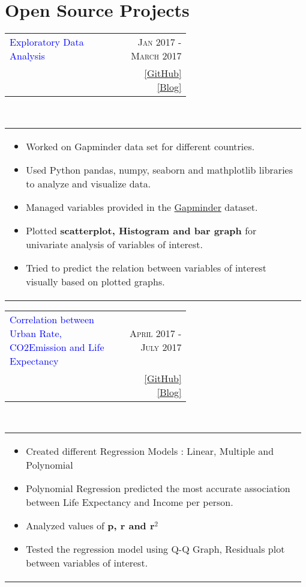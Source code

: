 \documentclass[a4paper]{article} %
\newcommand{\verticalspacing}{-0.25cm}
\newcommand{\bulletspace}{0.7cm}
\newcommand{\projectheadspacing}{6.9cm}
\newcommand{\cproject}[5]{%
    \begin{tabular}{p{0.60\linewidth}r}
        \textcolor{blue}{\small #2} & \multicolumn{1}{m{ \projectheadspacing{} }}{\raggedleft \small {\textsc{#1}}}\\
        \small {#3} & \small {#4}
    \end{tabular}\\
    \begin{tabular}{p{0.98\linewidth}}
    \vspace{-0.3cm}
        \small{#5}
    \end{tabular}
    \vspace{\verticalspacing{}}
}
\begin{document}
\section{Open Source Projects}

\cproject
    {Jan 2017 - March 2017}
    {Exploratory Data Analysis}
    {\textsc{\raggedright Data Analysis, Coursera}}
    {\href{https://github.com/er-ashish01/Data_Management_and_Visualization} {[GitHub]} \href{https://erashish01.tumblr.com/post/156297127705/data-management-and-visualization-week4} {[Blog]}}
    {%
        \begin{itemize}[leftmargin=\bulletspace{}]
            \item Worked on Gapminder data set for different countries.
            \item Used Python pandas, numpy, seaborn and mathplotlib libraries to analyze and visualize data.
            \item Managed variables provided in the {\href{https://drive.google.com/file/d/1j3MM8wHSikaf8cCef9hhe9VKhs-VYW6b/view} {Gapminder}} dataset.
            \item Plotted \textbf{scatterplot, Histogram and bar graph} for univariate analysis of variables of interest.
            \item Tried to predict the relation between variables of interest visually based on plotted graphs.

        \end{itemize}
    }

\cproject
    {April 2017 - July 2017}
    {Correlation between Urban Rate, CO2Emission and Life Expectancy}
    {\textsc{\raggedright Machine Learning, Coursera}}
    {\href{https://github.com/er-ashish01/Basics_of_Linear_Regression} {[GitHub]} \href{https://erashish01.tumblr.com/post/161823663110/basic-linear-regression-model-week-3} {[Blog]}}
    {%
        \begin{itemize}[leftmargin=\bulletspace{}]
            \item Created different Regression Models : Linear, Multiple and Polynomial
            \item Polynomial Regression predicted the most accurate association between Life Expectancy and Income per person.
            \item Analyzed values of \textbf{p, r and r$^{2}$}
            \item Tested the regression model using Q-Q Graph, Residuals plot between variables of interest.
        \end{itemize}
    }
\end{document}
